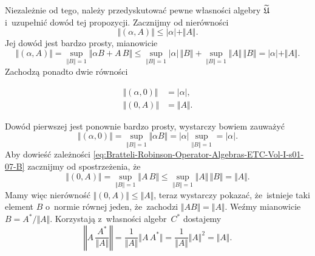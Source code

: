 \documentclass[a4paper,11pt]{article}
\begin{document}
Niezależnie od tego, należy przedyskutować pewne własności algebry
$\widetilde{\mathfrak{U}}$ i~uzupełnić dowód tej propozycji. Zacznijmy od nierówności
\begin{equation}
  \label{eq:Bratteli-Robinson-Operator-Algebras-ETC-Vol-I-s01-05}
  \Vert ( \alpha, A ) \Vert \leq | \alpha | + \Vert A \Vert.
\end{equation}
Jej dowód jest bardzo prosty, mianowicie
\begin{equation}
  \label{eq:Bratteli-Robinson-Operator-Algebras-ETC-Vol-I-s01-06}
  \Vert ( \alpha, A ) \Vert =
  \sup_{ \Vert B \Vert = 1 } \Vert \alpha B + A \, B \Vert \leq
  \sup_{ \Vert B \Vert = 1 } | \alpha | \, \Vert B \Vert +
  \sup_{ \Vert B \Vert = 1 } \Vert A \Vert \, \Vert B \Vert =
  | \alpha | + \Vert A \Vert.
\end{equation}
Zachodzą ponadto dwie równości

\vspace{\negVerSpaceFour}


\begin{subequations}

  \begin{align}
    \label{eq:Bratteli-Robinson-Operator-Algebras-ETC-Vol-I-s01-07-A}
    \Vert ( \alpha, 0 ) \Vert &= | \alpha |, \\
    \label{eq:Bratteli-Robinson-Operator-Algebras-ETC-Vol-I-s01-07-B}
    \Vert ( 0, A ) \Vert &= \Vert A \Vert.
  \end{align}

\end{subequations}

\noindent
Dowód pierwszej jest ponownie bardzo prosty, wystarczy bowiem zauważyć
\begin{equation}
  \label{eq:Bratteli-Robinson-Operator-Algebras-ETC-Vol-I-s01-08}
  \Vert ( \alpha, 0 ) \Vert =
  \sup_{ \Vert B \Vert = 1 } \Vert \alpha B \Vert =
  | \alpha | \sup_{ \Vert B \Vert = 1 } = | \alpha |.
\end{equation}
Aby dowieść zależności
\eqref{eq:Bratteli-Robinson-Operator-Algebras-ETC-Vol-I-s01-07-B} zacznijmy
od spostrzeżenia, że
\begin{equation}
  \label{eq:Bratteli-Robinson-Operator-Algebras-ETC-Vol-I-s01-09}
  \Vert ( 0, A ) \Vert =
  \sup_{ \Vert B \Vert = 1 } \Vert A \, B \Vert \leq
  \sup_{ \Vert B \Vert = 1 } \Vert A \Vert \, \Vert B \Vert = \Vert A \Vert.
\end{equation}
Mamy więc nierówność $\Vert ( 0, A ) \Vert \leq \Vert A \Vert$, teraz wystarczy pokazać,
że~istnieje taki element $B$ o~normie równej jeden, że~zachodzi
$\Vert A B \Vert = \Vert A \Vert$. Weźmy mianowicie $B = A^{ * } / \Vert A \Vert$. Korzystają
z~własności algebr~$C^{ * }$ dostajemy
\begin{equation}
  \label{eq:Bratteli-Robinson-Operator-Algebras-ETC-Vol-I-s01-10}
  \left\Vert A \, \frac{ A^{ * } }{ \Vert A \Vert } \right\Vert =
  \frac{ 1 }{ \Vert A \Vert } \Vert A \, A^{ * } \Vert =
  \frac{ 1 }{ \Vert A \Vert } \Vert A \Vert^{ 2 } = \Vert A \Vert.
\end{equation}
\end{document}
